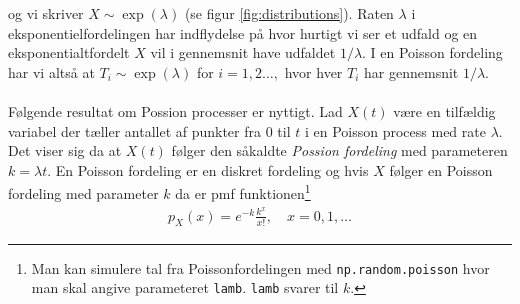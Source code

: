 \documentclass{article}
\begin{document}
og vi skriver $X \sim \exp(\lambda)$ (se figur \ref{fig:distributions}). Raten $\lambda$ i eksponentielfordelingen har indflydelse på hvor hurtigt vi ser et udfald og en eksponentialtfordelt $X$ vil i gennemsnit have udfaldet $1/\lambda$. I en Poisson fordeling har vi altså at $T_i \sim \exp(\lambda)$ for $i = 1,2\dots,$ hvor hver $T_i$ har gennemsnit $1/\lambda$.
\\ \\
Følgende resultat om Possion processer er nyttigt. Lad $X(t)$ være en tilfældig variabel der tæller antallet af punkter fra $0$ til $t$ i en Poisson process med rate $\lambda$. Det viser sig da at $X(t)$ følger den såkaldte \textit{Possion fordeling} med parameteren $k = \lambda t$. En Poisson fordeling er en diskret fordeling og hvis $X$ følger en Poisson fordeling med parameter $k$ da er pmf funktionen\footnote{Man kan simulere tal fra Poissonfordelingen med \texttt{np.random.poisson} hvor man skal angive parameteret \texttt{lamb}. \texttt{lamb} svarer til $k$.}
\begin{align*}
p_X(x) = e^{-k}\frac{k^x}{x!}, \quad x = 0,1,\dots
\end{align*}
\end{document}
